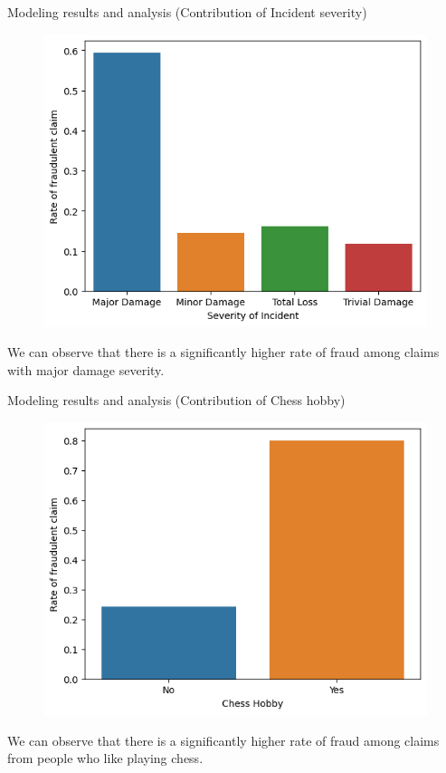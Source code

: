 \documentclass[aspectratio=169,xcolor=dvipsnames]{beamer}
\begin{document}
\begin{frame}{Modeling results and analysis (Contribution of Incident severity)}

\begin{figure}
\includegraphics[scale = 0.5]{Severivity.png}
\end{figure}

We can observe that there is a significantly higher rate of fraud among claims with major damage severity. 

\end{frame}

\begin{frame}{Modeling results and analysis (Contribution of Chess hobby)}

\begin{figure}
\includegraphics[scale = 0.5]{Chess.png}
\end{figure}

We can observe that there is a significantly higher rate of fraud among claims from people who like playing chess. 

\end{frame}
\end{document}
